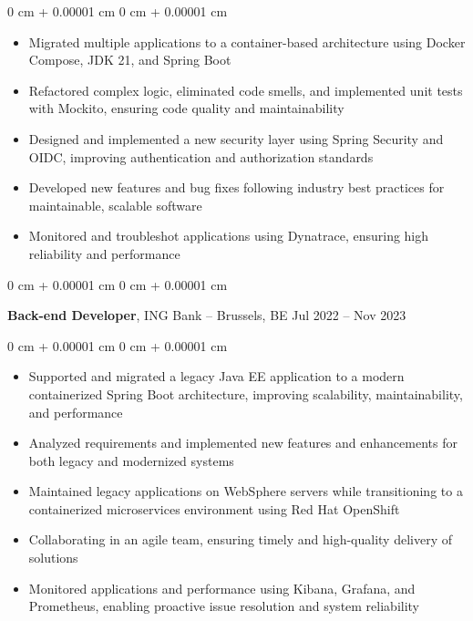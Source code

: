 \documentclass[10pt, letterpaper]{article}
\newenvironment{highlights}{
    \begin{itemize}[
        topsep=0.10 cm,
        parsep=0.10 cm,
        partopsep=0pt,
        itemsep=0pt,
        leftmargin=0 cm + 10pt
    ]
}{
    \end{itemize}
} %
\newenvironment{onecolentry}{
    \begin{adjustwidth}{
        0 cm + 0.00001 cm
    }{
        0 cm + 0.00001 cm
    }
}{
    \end{adjustwidth}
} %
\newenvironment{twocolentry}[2][]{
    \onecolentry
    \def\secondColumn{#2}
    \setcolumnwidth{\fill, 4.5 cm}
    \begin{paracol}{2}
}{
    \switchcolumn \raggedleft \secondColumn
    \end{paracol}
    \endonecolentry
} %
\begin{document}
        \vspace{0.10 cm}
        
        \begin{onecolentry}
            \begin{highlights}
                \item Migrated multiple applications to a container-based architecture using Docker Compose, JDK 21, and Spring Boot
                \item Refactored complex logic, eliminated code smells, and implemented unit tests with Mockito, ensuring code quality and maintainability
                \item Designed and implemented a new security layer using Spring Security and OIDC, improving authentication and authorization standards
                \item Developed new features and bug fixes following industry best practices for maintainable, scalable software
                \item Monitored and troubleshot applications using Dynatrace, ensuring high reliability and performance
            \end{highlights}
        \end{onecolentry}
        
        \vspace{0.2 cm}

        \begin{twocolentry}{
            Jul 2022 – Nov 2023
        }
            \textbf{Back-end Developer}, ING Bank -- Brussels, BE\end{twocolentry}

        \vspace{0.10 cm}
        
        \begin{onecolentry}
            \begin{highlights}
                \item Supported and migrated a legacy Java EE application to a modern containerized Spring Boot architecture, improving scalability, maintainability, and performance
                \item Analyzed requirements and implemented new features and enhancements for both legacy and modernized systems
                \item Maintained legacy applications on WebSphere servers while transitioning to a containerized microservices environment using Red Hat OpenShift
                \item Collaborating in an agile team, ensuring timely and high-quality delivery of solutions
                \item Monitored applications and performance using Kibana, Grafana, and Prometheus, enabling proactive issue resolution and system reliability
            \end{highlights}
        \end{onecolentry}
        
\end{document}
